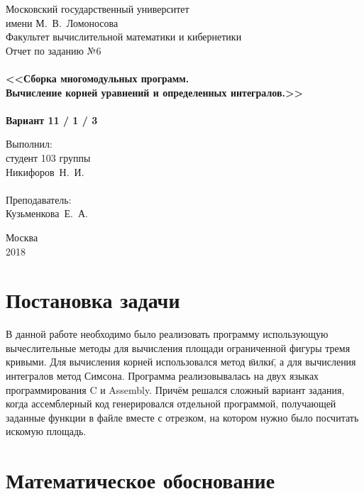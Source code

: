 \documentclass[a4paper,12pt,titlepage,finall]{article}
\begin{document}
\begin{titlepage}
    \begin{center}
	{\small \sc Московский государственный университет \\имени М.~В.~Ломоносова\\
	Факультет вычислительной математики и кибернетики\\}
	\vfill
	{\Large \sc Отчет по заданию №6}\\
	~\\
	{\large \bf <<Сборка многомодульных программ. \\
	Вычисление корней уравнений и определенных интегралов.>>}\\ 
	~\\
	{\large \bf Вариант 11 / 1 / 3}
    \end{center}
    \begin{flushright}
	\vfill {Выполнил:\\
	студент 103 группы\\
	Никифоров~Н.~И.\\
	~\\
	Преподаватель:\\
	Кузьменкова~Е.~А.}
    \end{flushright}
    \begin{center}
	\vfill
	{\small Москва\\2018}
    \end{center}
\end{titlepage}

\tableofcontents
\newpage

\section{Постановка задачи}

В данной работе необходимо было реализовать программу использующую вычеслительные методы для вычисления площади ограниченной фигуры тремя кривыми. Для вычисления корней использовался метод \"вилки\", а для вычисления интегралов метод Симсона. Программа реализовывалась на двух языках программирования C и Assembly. Причём решался сложный вариант задания, когда ассемблерный код генерировался отдельной программой, получающей заданные функции в файле вместе с отрезком, на котором нужно было посчитать искомую площадь.

\newpage

\section{Математическое обоснование}
\end{document}
